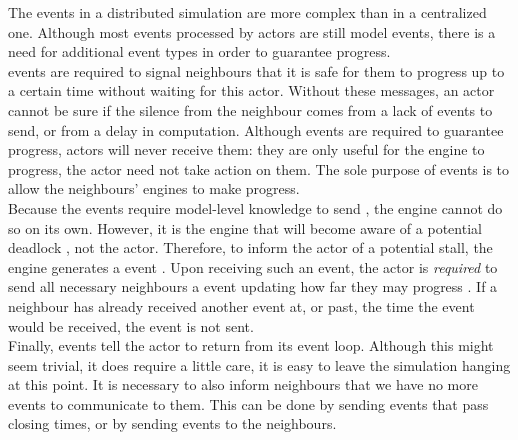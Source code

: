 The events in a distributed simulation are more complex than in a centralized one.
Although most events processed by actors are still model events, there is a need for additional event types in order to guarantee progress.\\
 events are required to signal neighbours that it is safe for them to progress up to a certain time without waiting for this actor.
Without these messages, an actor cannot be sure if the silence from the neighbour comes from a lack of events to send, or from a delay in computation.
Although  events are required to guarantee progress, actors will never receive them: they are only useful for the engine to progress, the actor need not take action on them.
The sole purpose of  events is to allow the neighbours' engines to make progress.\\
Because the  events require model-level knowledge to send , the engine cannot do so on its own.
However, it is the engine that will become aware of a potential deadlock , not the actor.
Therefore, to inform the actor of a potential stall, the engine generates a  event .
Upon receiving such an event, the actor is \emph{required} to send all necessary neighbours a  event updating how far they may progress .
If a neighbour has already received another event at, or past, the time the  event would be received, the  event is not sent. \\ %
Finally,  events tell the actor to return from its event loop.
Although this might seem trivial, it does require a little care, it is easy to leave the simulation hanging at this point. 
It is necessary to also inform neighbours that we have no more events to communicate to them.
This can be done by sending  events that pass closing times, or by sending  events to the neighbours.

